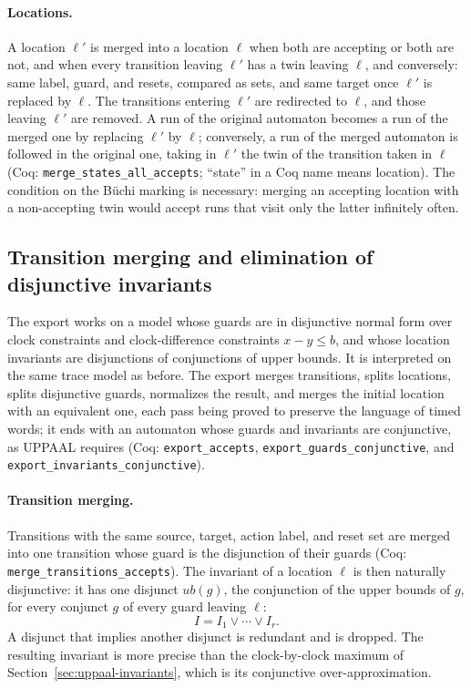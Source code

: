 \paragraph{Locations.}
A location $\ell'$ is merged into a location $\ell$ when both are accepting or
both are not, and when every transition leaving $\ell'$ has a twin leaving
$\ell$, and conversely: same label, guard, and resets, compared as sets, and
same target once $\ell'$ is replaced by $\ell$.  The transitions entering
$\ell'$ are redirected to $\ell$, and those leaving $\ell'$ are removed.  A run
of the original automaton becomes a run of the merged one by replacing $\ell'$
by $\ell$; conversely, a run of the merged automaton is followed in the
original one, taking in $\ell'$ the twin of the transition taken in $\ell$
(Coq: \texttt{merge\_\allowbreak{}states\_\allowbreak{}all\_\allowbreak{}accepts}; ``state'' in a Coq name
means location).  The condition on the B\"uchi marking is necessary: merging
an accepting location with a non-accepting twin would accept runs that visit only the latter infinitely
often.


\subsection{Transition merging and elimination of disjunctive invariants}
\label{subsec:disjunctive-invariants}

The export works on a model whose guards are in disjunctive normal form over
clock constraints and clock-difference constraints $x-y\le b$, and whose
location invariants are disjunctions of conjunctions of upper bounds.  It is
interpreted on the same trace model as before.  The export merges
transitions, splits locations, splits disjunctive guards, normalizes the
result, and merges the initial location with an equivalent one, each pass
being proved to preserve the language of timed words; it
ends with an
automaton whose guards and invariants are conjunctive, as UPPAAL requires
(Coq: \texttt{export\_\allowbreak{}accepts},
\texttt{export\_\allowbreak{}guards\_\allowbreak{}conjunctive}, and
\texttt{export\_\allowbreak{}invariants\_\allowbreak{}conjunctive}).

\paragraph{Transition merging.}
Transitions with the same source, target, action label, and reset set are
merged into one transition whose guard is the disjunction of their guards (Coq:
\texttt{merge\_\allowbreak{}transitions\_\allowbreak{}accepts}).  The invariant of a location
$\ell$ is then naturally disjunctive: it has one disjunct
$\mathit{ub}(g)$, the conjunction of the upper bounds of $g$, for every
conjunct $g$ of every guard leaving $\ell$:
\[
  I = I_1 \lor \cdots \lor I_r.
\]
A disjunct that implies another disjunct is redundant and is dropped.  The
resulting invariant is more precise than the clock-by-clock maximum of
Section~\ref{sec:uppaal-invariants}, which is its conjunctive
over-approximation.

